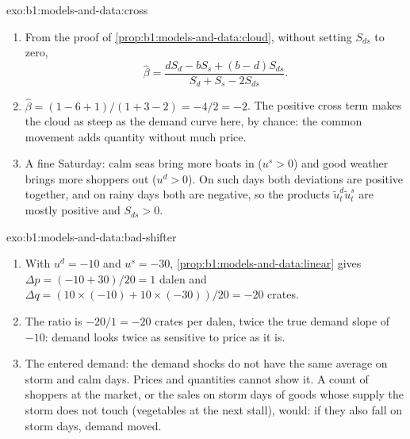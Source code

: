 \begin{solution}{exo:b1:models-and-data:cross}
\begin{enumerate}
  \item From the proof of \cref{prop:b1:models-and-data:cloud}, without
    setting $S_{ds}$ to zero,
    \[
    \hat\beta = \frac{d S_d - b S_s + (b - d) S_{ds}}{S_d + S_s - 2 S_{ds}} .
    \]
  \item $\hat\beta = (1 - 6 + 1)/(1 + 3 - 2) = -4/2 = -2$. The positive cross
    term makes the cloud as steep as the demand curve here, by chance: the
    common movement adds quantity without much price.
  \item A fine Saturday: calm seas bring more boats in ($u^s > 0$) and good
    weather brings more shoppers out ($u^d > 0$). On such days both
    deviations are positive together, and on rainy days both are negative,
    so the products $\tilde u^d_t \tilde u^s_t$ are mostly positive and
    $S_{ds} > 0$.
\end{enumerate}
\end{solution}

\begin{solution}{exo:b1:models-and-data:bad-shifter}
\begin{enumerate}
  \item With $u^d = -10$ and $u^s = -30$, \cref{prop:b1:models-and-data:linear}
    gives $\Delta p = (-10 + 30)/20 = 1$ dalen and
    $\Delta q = (10 \times (-10) + 10 \times (-30))/20 = -20$ crates.
  \item The ratio is $-20/1 = -20$ crates per dalen, twice the true demand
    slope of $-10$: demand looks twice as sensitive to price as it is.
  \item The  entered demand: the demand shocks do not have the same
    average on storm and calm days. Prices and quantities cannot show it.
    A count of shoppers at the market, or the sales on storm days of goods
    whose supply the storm does not touch (vegetables at the next stall),
    would: if they also fall on storm days, demand moved.
\end{enumerate}
\end{solution}

